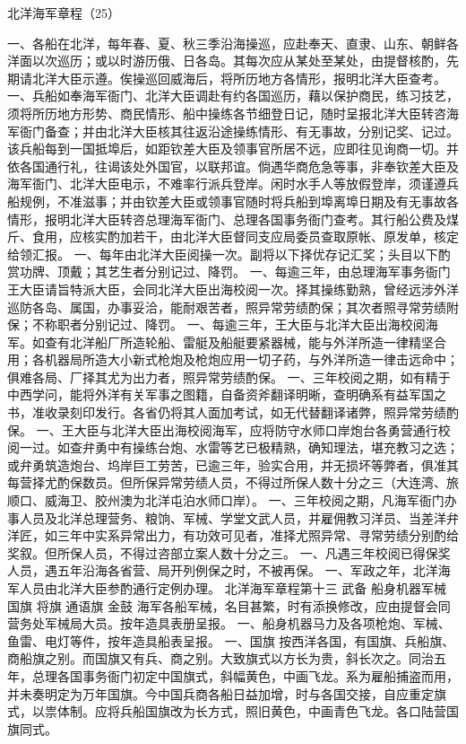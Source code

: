 \documentclass[12pt,UTF8]{ctexbook}
\begin{document}
北洋海军章程（25）

一、各船在北洋，每年春、夏、秋三季沿海操巡，应赴奉天、直隶、山东、朝鲜各洋面以次巡历；或以时游历俄、日各岛。其每次应从某处至某处，由提督核酌，先期请北洋大臣示遵。俟操巡回威海后，将所历地方各情形，报明北洋大臣查考。
一、兵船如奉海军衙门、北洋大臣调赴有约各国巡历，藉以保护商民，练习技艺，须将所历地方形势、商民情形、船中操练各节细登日记，随时呈报北洋大臣转咨海军衙门备查；并由北洋大臣核其往返沿途操练情形、有无事故，分别记奖、记过。该兵船每到一国抵埠后，如距钦差大臣及领事官所居不远，应即往见询商一切。并依各国通行礼，往谒该处外国官，以联邦谊。倘遇华商危急等事，非奉钦差大臣及海军衙门、北洋大臣电示，不难率行派兵登岸。闲时水手人等放假登岸，须谨遵兵船规例，不准滋事；并由钦差大臣或领事官随时将兵船到埠离埠日期及有无事故各情形，报明北洋大臣转咨总理海军衙门、总理各国事务衙门查考。其行船公费及煤斤、食用，应核实酌加若干，由北洋大臣督同支应局委员查取原帐、原发单，核定给领汇报。
一、每年由北洋大臣阅操一次。副将以下择优存记汇奖；头目以下酌赏功牌、顶戴；其艺生者分别记过、降罚。
一、每逾三年，由总理海军事务衙门王大臣请旨特派大臣，会同北洋大臣出海校阅一次。择其操练勤熟，曾经远涉外洋巡防各岛、属国，办事妥洽，能耐艰苦者，照异常劳绩酌保；其次者照寻常劳绩附保；不称职者分别记过、降罚。
一、每逾三年，王大臣与北洋大臣出海校阅海军。如查有北洋船厂所造轮船、雷艇及船艇要紧器械，能与外洋所造一律精坚合用；各机器局所造大小新式枪炮及枪炮应用一切子药，与外洋所造一律击远命中；俱难各局、厂择其尤为出力者，照异常劳绩酌保。
一、三年校阅之期，如有精于中西学问，能将外洋有关军事之图籍，自备资斧翻译明晰，查明确系有益军国之书，准收录刻印发行。各省仍将其人面加考试，如无代替翻译诸弊，照异常劳绩酌保。
一、王大臣与北洋大臣出海校阅海军，应将防守水师口岸炮台各勇营通行校阅一过。如查弁勇中有操练台炮、水雷等艺已极精熟，确知理法，堪充教习之选；或弁勇筑造炮台、坞岸巨工劳苦，已逾三年，验实合用，并无损坏等弊者，俱准其每营择尤酌保数员。但所保异常劳绩人员，不得过所保人数十分之三（大连湾、旅顺口、威海卫、胶州澳为北洋屯泊水师口岸）。
一、三年校阅之期，凡海军衙门办事人员及北洋总理营务、粮饷、军械、学堂文武人员，并雇佣教习洋员、当差洋弁洋匠，如三年中实系异常出力，有功效可见者，准择尤照异常、寻常劳绩分别酌给奖叙。但所保人员，不得过咨部立案人数十分之三。
一、凡遇三年校阅已得保奖人员，遇五年沿海各省营、局开列例保之时，不被再保。
一、军政之年，北洋海军人员由北洋大臣参酌通行定例办理。
北洋海军章程第十三
武备 船身机器军械 国旗 将旗 通语旗 金鼓
海军各船军械，名目甚繁，时有添换修改，应由提督会同营务处军械局大员。按年造具表册呈报。
一、船身机器马力及各项枪炮、军械、鱼雷、电灯等件，按年造具船表呈报。
一、国旗
按西洋各国，有国旗、兵船旗、商船旗之别。而国旗又有兵、商之别。大致旗式以方长为贵，斜长次之。同治五年，总理各国事务衙门初定中国旗式，斜幅黄色，中画飞龙。系为雇船捕盗而用，并未奏明定为万年国旗。今中国兵商各船日益加增，时与各国交接，自应重定旗式，以祟体制。应将兵船国旗改为长方式，照旧黄色，中画青色飞龙。各口陆营国旗同式。
\end{document}
